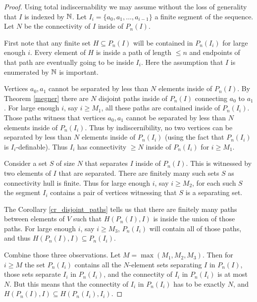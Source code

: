 \begin{proof}
  Using total indiscernability we may assume without the loss of generality that $I$ is indexed by $\mathbb{N}$.
  Let $I_i = \{a_0, a_1, \ldots, a_{i-1}\}$ a finite segment of the sequence.
  Let $N$ be the connectivity of $I$ inside of $P_n(I)$.

  First note that any finite set $H \subseteq P_n(I)$ will be contained in $P_n(I_i)$ for large enough $i$.
  Every element of $H$ is inside a path of length $\leq n$ and endpoints of that path are eventually going to be inside $I_i$.
  Here the assumption that $I$ is enumerated by $\mathbb{N}$ is important.

  Vertices $a_0, a_1$ cannot be separated by less than $N$ elements inside of $P_n(I)$.
  By Theorem \ref{megner} there are $N$ disjoint paths inside of $P_n(I)$ connecting $a_0$ to $a_1$.
  For large enough $i$, say $i \geq M_1$, all these paths are contained inside of $P_n(I_i)$.
  Those paths witness that vertices $a_0, a_1$ cannot be separated by less than $N$ elements inside of $P_n(I_i)$.
  Thus by indiscernibility, no two vertices can be separated by less than $N$ elements inside of $P_n(I_i)$
  (using the fact that $P_n(I_i)$ is $I_i$-definable).
  Thus $I_i$ has connectivity $\geq N$ inside of $P_n(I_i)$ for $i \geq M_1$.

  Consider a set $S$ of size $N$ that separates $I$ inside of $P_n(I)$.
  This is witnessed by two elements of $I$ that are separated.
  There are finitely many such sets $S$ as connectivity hull is finite.
  Thus for large enough $i$, say $i \geq M_2$, for each such $S$
  the segment $I_i$ contains a pair of vertices witnessing that $S$ is a separating set.

  The Corollary \ref{cr_disjoint_paths} tells us that there are finitely many paths between elements of $V$ such that
  $H(P_n(I), I)$ is inside the union of those paths.
  For large enough $i$, say $i \geq M_3$, $P_n(I_i)$ will contain all of those paths, and thus $H(P_n(I), I) \subseteq P_n(I_i)$.

  Combine those three observations.
  Let $M = \max(M_1, M_2, M_3)$.
  Then for $i \geq M$ the set $P_n(I_i)$ contains all the $N$-element sets separating $I$ in $P_n(I)$,
  those sets separate $I_i$ in $P_n(I_i)$,
  and the connectity of $I_i$ in $P_n(I_i)$ is at most $N$.
  But this means that the connectity of $I_i$ in $P_n(I_i)$ has to be exactly $N$, and $H(P_n(I), I) \subseteq H(P_n(I_i), I_i)$.


\end{proof}
